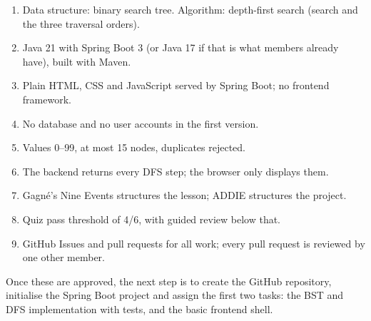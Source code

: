 \documentclass[11pt,a4paper]{article}
\begin{document}
\begin{enumerate}
  \item Data structure: binary search tree. Algorithm: depth-first search (search and the three traversal orders).
  \item Java 21 with Spring Boot 3 (or Java 17 if that is what members already have), built with Maven.
  \item Plain HTML, CSS and JavaScript served by Spring Boot; no frontend framework.
  \item No database and no user accounts in the first version.
  \item Values 0--99, at most 15 nodes, duplicates rejected.
  \item The backend returns every DFS step; the browser only displays them.
  \item Gagné's Nine Events structures the lesson; ADDIE structures the project.
  \item Quiz pass threshold of 4/6, with guided review below that.
  \item GitHub Issues and pull requests for all work; every pull request is reviewed by one other member.
\end{enumerate}

Once these are approved, the next step is to create the GitHub repository, initialise the Spring
Boot project and assign the first two tasks: the BST and DFS implementation with tests, and the
basic frontend shell.
\end{document}
